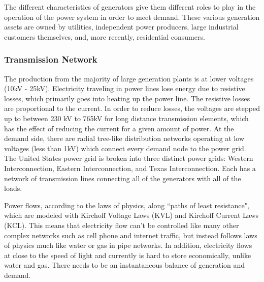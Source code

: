 	The different characteristics of generators give them different roles to play in the operation of the power system in order to meet demand.  These various generation assets are owned by utilities, independent power producers, large industrial customers themselves, and, more recently, residential consumers.  

\subsubsection{Transmission Network}
	The production from the majority of large generation plants is at lower voltages (10kV - 25kV).  Electricity traveling in power lines lose energy due to resistive losses, which primarily goes into heating up the power line.  The resistive losses are proportional to the current.  In order to reduce losses, the voltages are stepped up to between 230 kV to 765kV for long distance transmission elements, which has the effect of reducing the current for a given amount of power.  At the demand side, there are radial tree-like distribution networks operating at low voltages (less than 1kV) which connect every demand node to the power grid.  The United States power grid is broken into three distinct power grids: Western Interconnection, Eastern Interconnection, and Texas Interconnection. Each has a network of transmission lines connecting all of the generators with all of the loads.  

	Power flows, according to the laws of physics, along ``paths of least resistance", which are modeled with Kirchoff Voltage Laws (KVL) and Kirchoff Current Laws (KCL).  This means that electricity flow can't be controlled like many other complex networks such as cell phone and internet traffic, but instead follows laws of physics much like water or gas in pipe networks.  In addition, electricity flows at close to the speed of light and currently is hard to store economically, unlike water and gas.   There needs to be an instantaneous balance of generation and demand.  

